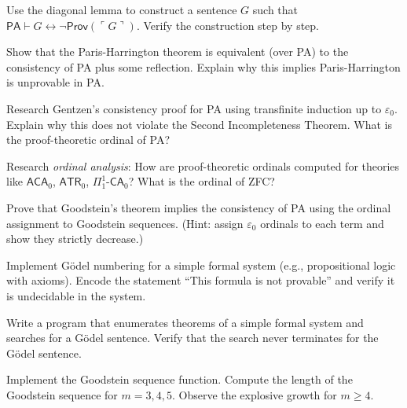 \begin{exercise}[Advanced]
Use the diagonal lemma to construct a sentence $G$ such that $\mathsf{PA} \vdash G \leftrightarrow \neg \mathsf{Prov}(\ulcorner G \urcorner)$. Verify the construction step by step.
\end{exercise}

\begin{exercise}[Advanced]
Show that the Paris-Harrington theorem is equivalent (over PA) to the consistency of PA plus some reflection. Explain why this implies Paris-Harrington is unprovable in PA.
\end{exercise}

\begin{exercise}[Challenge]
Research Gentzen's consistency proof for PA using transfinite induction up to $\varepsilon_0$. Explain why this does not violate the Second Incompleteness Theorem. What is the proof-theoretic ordinal of PA?
\end{exercise}

\begin{exercise}[Challenge]
Research \emph{ordinal analysis}: How are proof-theoretic ordinals computed for theories like $\mathsf{ACA}_0$, $\mathsf{ATR}_0$, $\Pi^1_1\text{-}\mathsf{CA}_0$? What is the ordinal of ZFC?
\end{exercise}

\begin{exercise}[Challenge]
Prove that Goodstein's theorem implies the consistency of PA using the ordinal assignment to Goodstein sequences. (Hint: assign $\varepsilon_0$ ordinals to each term and show they strictly decrease.)
\end{exercise}

\begin{exercise}[Computational]
Implement Gödel numbering for a simple formal system (e.g., propositional logic with axioms). Encode the statement ``This formula is not provable'' and verify it is undecidable in the system.
\end{exercise}

\begin{exercise}[Computational]
Write a program that enumerates theorems of a simple formal system and searches for a Gödel sentence. Verify that the search never terminates for the Gödel sentence.
\end{exercise}

\begin{exercise}[Computational]
Implement the Goodstein sequence function. Compute the length of the Goodstein sequence for $m = 3, 4, 5$. Observe the explosive growth for $m \ge 4$.
\end{exercise}

